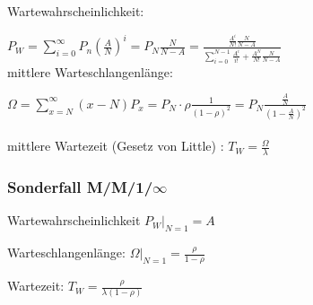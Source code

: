 \documentclass[fs, footer]{latex4ei}
\begin{document}
\begin{multicols*}{4}
{	Wartewahrscheinlichkeit:

	$P_W = \sum \limits_{i=0}^{\infty} P_n (\frac{A}{N})^i = P_N \frac{N}{N-A} = \frac{\frac{A^i}{N!} \frac{N}{N-A}}{\sum \limits_{i = 0}^{N-1} \frac{A^i}{i!} + \frac{A^N}{N!} \frac{N}{N-A}}$ \\

	mittlere Warteschlangenlänge:

	$\Omega = \sum \limits^{\infty}_{x = N} (x - N) P_x = P_N \cdot \rho \frac{1}{(1- \rho)^2} = P_N \frac{\frac{A}{N}}{(1 - \frac{A}{N})^2}$ \\ \\

	mittlere Wartezeit (Gesetz von Little) : $T_W = \frac{\Omega}{\lambda}$ \\ 



	\subsubsection{Sonderfall M/M/1/$\infty$}

	Wartewahrscheinlichkeit $P_W |_{N =1} = A$

	Warteschlangenlänge: $\Omega |_{N=1} = \frac{\rho}{1 - \rho}$

	Wartezeit: $T_W = \frac{\rho}{\lambda (1 - \rho)}$
}




\end{multicols*}

\end{document}
